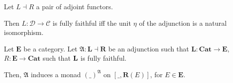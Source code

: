 \documentclass{report}
\begin{document}
\begin{prop}{\cite{wakamatsu1980note}}
    \label{fullSplitEpi}
    Let $L\dashv R$ a pair of adjoint functors.

    Then $L : \mathcal{D}\rightarrow \mathcal{C}$ is fully faithful iff the unit $\eta$ of the adjunction is a natural isomorphism.
\end{prop}

\begin{thm}
    Let $\textbf{E}$ be a category.
    Let $\mathfrak{A} : \textbf{L}\dashv \textbf{R}$ be an adjunction such that $\textbf{L} : \textbf{Cat} \rightarrow \textbf{E}$, $R : \textbf{E} \rightarrow \textbf{Cat}$  such that $\bf L$ is fully faithful.

    Then, $\mathfrak{A}$ induces a monad $(\_)^\mathfrak{A}$ on $[\_,\textbf{R}(E)]$, for $E \in \textbf{E}$.
\end{thm}
\end{document}
